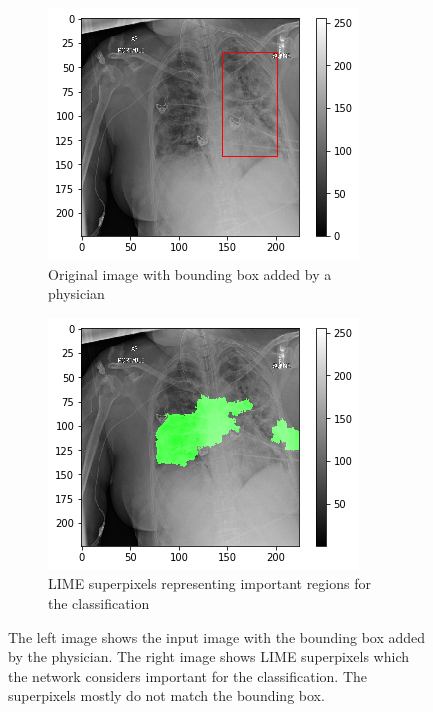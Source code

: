 \begin{figure}[H]
    \centering
    \begin{subfigure}[t]{.45\textwidth}
        \centering
        \includegraphics[width=\linewidth]{chapters/03_classification/images/rise2_bbox.png}
        \caption{Original image with bounding box added by a physician}
    \end{subfigure}\hspace{1cm}%
    \begin{subfigure}[t]{.45\textwidth}
        \centering
        \includegraphics[width=\linewidth]{chapters/03_classification/images/lime_8.png}
        \caption{LIME superpixels representing important regions for the classification}
    \end{subfigure}
    \caption{The left image shows the input image with the bounding box added by the physician.  The right image  shows  LIME  superpixels  which  the  network considers  important  for  the  classification. The superpixels mostly do not match the bounding box.}
    \label{lime_example_3}
\end{figure}


